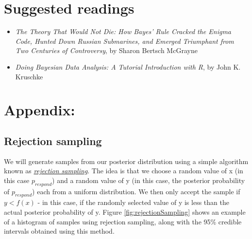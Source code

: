 \documentclass[12pt,]{book}
\providecommand{\tightlist}{%
  \setlength{\itemsep}{0pt}\setlength{\parskip}{0pt}}
\theoremstyle{definition}
\theoremstyle{definition}
\theoremstyle{definition}
\theoremstyle{remark}
\begin{document}
\hypertarget{suggested-readings-8}{%
\section{Suggested readings}\label{suggested-readings-8}}

\begin{itemize}
\tightlist
\item
  \emph{The Theory That Would Not Die: How Bayes' Rule Cracked the Enigma Code, Hunted Down Russian Submarines, and Emerged Triumphant from Two Centuries of Controversy}, by Sharon Bertsch McGrayne
\item
  \emph{Doing Bayesian Data Analysis: A Tutorial Introduction with R}, by John K. Kruschke
\end{itemize}

\hypertarget{appendix-3}{%
\section{Appendix:}\label{appendix-3}}

\hypertarget{rejection-sampling}{%
\subsection{Rejection sampling}\label{rejection-sampling}}

We will generate samples from our posterior distribution using a simple algorithm known as \href{https://am207.github.io/2017/wiki/rejectionsampling.html}{\emph{rejection sampling}}. The idea is that we choose a random value of x (in this case \(p_{respond}\)) and a random value of y (in this case, the posterior probability of \(p_{respond}\)) each from a uniform distribution. We then only accept the sample if \(y < f(x)\) - in this case, if the randomly selected value of y is less than the actual posterior probability of y. Figure \ref{fig:rejectionSampling} shows an example of a histogram of samples using rejection sampling, along with the 95\% credible intervals obtained using this method.
\end{document}
